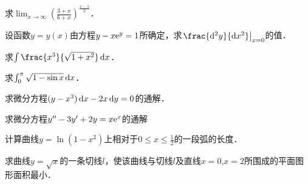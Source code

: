 \documentclass[plain,noanswer,medmath]{../../template/jnuexam}
\begin{document}


\begin{problem}
求$\lim_{x \to \infty} \left(\frac{3 + x}{6 + x} \right)^{\frac{x - 1}{2}}$．
\end{problem}


\begin{problem}
设函数$y = y(x)$由方程$y - x\mathrm{e}^y = 1$所确定，求$\left. \frac{\d^2 y}{\dx^2} \right|_{x = 0}$的值．
\end{problem}


\begin{problem}
求$\int \frac{x^3}{\sqrt{1 + x^2}} \dx$．
\end{problem}


\begin{problem}
求$\int_0^{\pi}\sqrt{1 - \sin x} \mathop{}\!\mathrm{d} x$．
\end{problem}


\begin{problem}
求微分方程$(y - x^3)\mathop{}\!\mathrm{d} x - 2x\mathop{}\!\mathrm{d} y = 0$的通解．
\end{problem}






\begin{problem}
求微分方程$y'' - 3y' + 2y = x\mathrm{e}^x$的通解
\end{problem}



\begin{problem}
计算曲线$y = \ln(1 - x^2)$上相对于$0 \le x \le \frac{1}{2}$的一段弧的长度．
\end{problem}



\begin{problem}
求曲线$y = \sqrt{x}$的一条切线$l$，使该曲线与切线$l$及直线$x = 0$,$x = 2$所围成的平面图形面积最小．
\end{problem}



\end{document}
